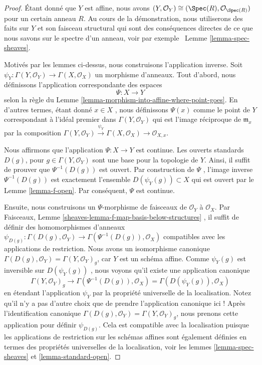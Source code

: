 \begin{proof}
Étant donné que  $Y$  est affine, nous avons  $(Y, \mathcal{O}_Y) \cong (\Spec(R), \mathcal{O}_{\Spec(R)})$  pour un certain
anneau  $R$. Au cours de la démonstration, nous utiliserons des faits sur
 $Y$  et son faisceau structural qui sont des conséquences directes de
ce que nous savons sur le spectre d'un anneau, voir par exemple \ Lemme
 \ref{lemma-spec-sheaves}.

\medskip\noindent
Motivés par les lemmes ci-dessus, nous construisons l'application inverse. Soit
 $\psi_Y : \Gamma(Y, \mathcal{O}_Y) \to \Gamma(X, \mathcal{O}_X)$  un morphisme d'anneaux. Tout d'abord, nous définissons l'application
correspondante des espaces
$$
\Psi : X \longrightarrow Y
$$
selon la règle du Lemme  \ref{lemma-morphism-into-affine-where-point-goes}. En d'autres termes, étant donné
 $x \in X$ , nous définissons  $\Psi(x)$  comme le point de  $Y$ 
correspondant à l'idéal premier dans  $\Gamma(Y, \mathcal{O}_Y)$  qui est l'image réciproque de
 $\mathfrak m_x$  par la composition  $
\Gamma(Y, \mathcal{O}_Y) \xrightarrow{\psi_Y}
\Gamma(X, \mathcal{O}_X) \to
\mathcal{O}_{X, x}
$.

\medskip\noindent
Nous affirmons que l'application  $\Psi : X \to Y$  est continue. Les ouverts standards
 $D(g)$, pour  $g \in \Gamma(Y, \mathcal{O}_Y)$  sont une base pour la topologie de  $Y$.
Ainsi, il suffit de prouver que  $\Psi^{-1}(D(g))$  est ouvert. Par construction de
 $\Psi$ , l'image inverse  $\Psi^{-1}(D(g))$  est exactement l'ensemble  $D(\psi_Y(g)) \subset X$ 
qui est ouvert par le Lemme  \ref{lemma-f-open}. Par conséquent,  $\Psi$  est
continue.

\medskip\noindent
Ensuite, nous construisons un  $\Psi$-morphisme de faisceaux de  $\mathcal{O}_Y$ 
à  $\mathcal{O}_X$. Par Faisceaux, Lemme  \ref{sheaves-lemma-f-map-basis-below-structures} , il suffit de définir des
homomorphismes d'anneaux  $\psi_{D(g)} : \Gamma(D(g), \mathcal{O}_Y) \to
\Gamma(\Psi^{-1}(D(g)), \mathcal{O}_X)$  compatibles avec les applications de
restriction. Nous avons un isomorphisme canonique  $\Gamma(D(g), \mathcal{O}_Y) = \Gamma(Y, \mathcal{O}_Y)_g$, car  $Y$ 
est un schéma affine. Comme  $\psi_Y(g)$  est inversible sur  $D(\psi_Y(g))$ , nous
voyons qu'il existe une application canonique
$$
\Gamma(Y, \mathcal{O}_Y)_g
\longrightarrow
\Gamma(\Psi^{-1}(D(g)), \mathcal{O}_X)
=
\Gamma(D(\psi_Y(g)), \mathcal{O}_X)
$$
en étendant l'application  $\psi_Y$  par la propriété universelle de la
localisation. Notez qu'il n'y a pas d'autre choix que de prendre l'application
canonique ici ! Après l'identification canonique
 $\Gamma(D(g), \mathcal{O}_Y) = \Gamma(Y, \mathcal{O}_Y)_g$, nous prenons cette application pour définir  $\psi_{D(g)}$. Cela est compatible avec la localisation
puisque les applications de restriction sur les schémas affines sont également
définies en termes des propriétés universelles de la localisation, voir les
lemmes  \ref{lemma-spec-sheaves}  et  \ref{lemma-standard-open}.


\end{proof}
